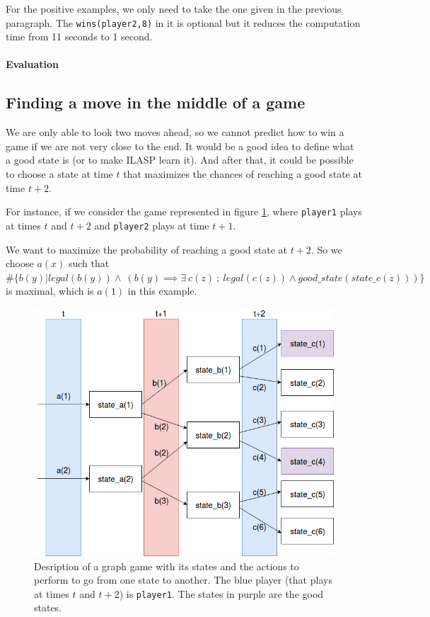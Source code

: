 \documentclass[12pt,twoside]{report}
\begin{document}
For the positive examples, we only need to take the one given in the previous paragraph. The \texttt{wins(player2,8)} in it is optional but it reduces the computation time from 11 seconds to 1 second.

\paragraph{Evaluation}


\subsection{Finding a move in the middle of a game}

We are only able to look two moves ahead, so we cannot predict how to win a game if we are not very close to the end. It would be a good idea to define what a good state is (or to make ILASP learn it). And after that, it could be possible to choose a state at time $t$ that maximizes the chances of reaching a good state at time $t+2$.

\bigskip

For instance, if we consider the game represented in figure \ref{fig:graph_game}, where \texttt{player1} plays at times $t$ and $t+2$ and \texttt{player2} plays at time $t+1$. 

\smallskip

We want to maximize the probability of reaching a good state at $t+2$. So we choose $a(x)$ such that $\#\{b(y)|legal(b(y))\wedge\:\left( b(y) \implies \exists \:c(z) \:;\: legal(c(z)) \wedge good\_state(state\_c(z)) \right)\}$ is maximal, which is $a(1)$ in this example.

\begin{figure}[h]
\centering
\includegraphics[width = 0.8\hsize]{graph_game.png}
\caption{Desription of a graph game with its states and the actions to perform to go from one state to another. The blue player (that plays at times $t$ and $t+2$) is \texttt{player1}. The states in purple are the good states.}
\label{fig:graph_game}
\end{figure}
\end{document}
